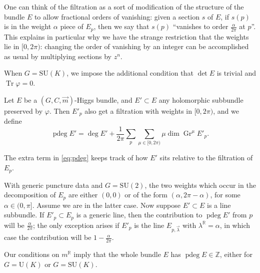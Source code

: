 \documentclass[12pt,letterpaper,reqno]{article}
\numberwithin{equation}{section}
\newcommand{\R}{\ensuremath{\mathbb R}}
\newcommand{\Z}{\ensuremath{\mathbb Z}}
\DeclareMathOperator{\Tr}{Tr}
\DeclareMathOperator{\pdeg}{pdeg}
\DeclareMathOperator{\Gr}{Gr}
\newcommand{\SU}{\mathrm{SU}}
\newcommand{\U}{\mathrm{U}}
\newcommand{\fixme}[1]{{\color{orange}{[#1]}}}
\begin{document}
\begin{remark}
One can think of the filtration as a sort of modification
of the structure of the bundle $E$ to allow fractional
orders of vanishing: given a section
$s$ of $E$, if $s(p)$ is in the weight $\alpha$ piece of $E_p$,
then we say that $s(p)$  ``vanishes to order $\frac{\alpha}{2\pi}$ at $p$''. This explains in particular why we have the strange
restriction that the weights lie in $[0,2\pi)$: changing the order
of vanishing by an integer can be accomplished as usual by multiplying sections by $z^n$.
\end{remark}

\begin{defn}[Parabolic Higgs bundles for $G = \SU(K)$]
When $G = \SU(K)$, we impose the additional condition that
$\det E$ is trivial \fixme{in the parabolic sense...} and 
$\Tr \varphi = 0$.
\end{defn}

\begin{defn}
Let $E$ be a $(G, C, \vec m)$-Higgs bundle,
and $E' \subset E$ any holomorphic subbundle preserved by
$\varphi$. Then $E'_p$ also get a filtration with
weights in $[0,2\pi)$, and we define
\begin{equation} \label{eq:pdeg}
  \pdeg E' = \deg E' + \frac{1}{2\pi} \sum_p \sum_{\mu \in [0,2\pi)} \mu \dim \Gr^\mu E'_p.
\end{equation}
\end{defn}

The extra term in \eqref{eq:pdeg} keeps track of how $E'$
sits relative to the filtration of $E_p$.

\begin{example}
With generic puncture data and $G = \SU(2)$,
the two weights which occur in the decomposition of 
$E_p$ are either $(0,0)$ or of the form
$(\alpha, 2\pi-\alpha)$, for some $\alpha \in (0,\pi]$.
Assume we are in the latter case.
Now suppose $E' \subset E$ is a line subbundle.
If $E'_p \subset E_p$ is a generic line, then the contribution
to $\pdeg E'$ from $p$ will be $\frac{\alpha}{2\pi}$; the
only exception arises if $E'_p$ is the line 
$E_{p,\vec\lambda}$ with $\lambda^\R = \alpha$, in which case 
the contribution will be $1 - \frac{\alpha}{2\pi}$. 
\end{example}

\begin{remark}Our conditions on $m^\R$ imply that the whole bundle $E$ has $\pdeg E \in \Z$,
either for $G = \U(K)$ or $G = \SU(K)$.
\end{remark}
\end{document}
